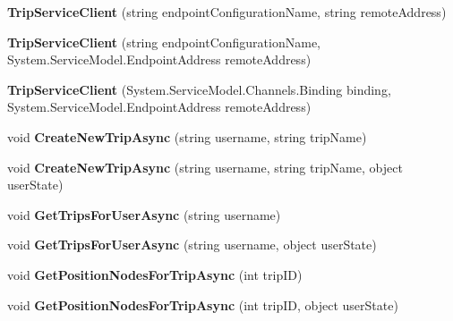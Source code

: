 \begin{DoxyCompactItemize}
\item 
\hypertarget{class_trip_service_client_ab4a2663da378c9b53d77ae14cb527579}{
{\bfseries TripServiceClient} (string endpointConfigurationName, string remoteAddress)}
\label{class_trip_service_client_ab4a2663da378c9b53d77ae14cb527579}

\item 
\hypertarget{class_trip_service_client_a14810eca7652c4f20b773d6f6ee80b4b}{
{\bfseries TripServiceClient} (string endpointConfigurationName, System.ServiceModel.EndpointAddress remoteAddress)}
\label{class_trip_service_client_a14810eca7652c4f20b773d6f6ee80b4b}

\item 
\hypertarget{class_trip_service_client_a74f3aec249adc60fef595b722d37599c}{
{\bfseries TripServiceClient} (System.ServiceModel.Channels.Binding binding, System.ServiceModel.EndpointAddress remoteAddress)}
\label{class_trip_service_client_a74f3aec249adc60fef595b722d37599c}

\item 
\hypertarget{class_trip_service_client_a18cd3772ac45b1a41badea694f81c090}{
void {\bfseries CreateNewTripAsync} (string username, string tripName)}
\label{class_trip_service_client_a18cd3772ac45b1a41badea694f81c090}

\item 
\hypertarget{class_trip_service_client_a9695ce0f452ce4efb9e811b12cd10e57}{
void {\bfseries CreateNewTripAsync} (string username, string tripName, object userState)}
\label{class_trip_service_client_a9695ce0f452ce4efb9e811b12cd10e57}

\item 
\hypertarget{class_trip_service_client_abf37a65ba72504c498cb9dce2f0f91c7}{
void {\bfseries GetTripsForUserAsync} (string username)}
\label{class_trip_service_client_abf37a65ba72504c498cb9dce2f0f91c7}

\item 
\hypertarget{class_trip_service_client_abdaa0d093a9662740585b7e61db6633a}{
void {\bfseries GetTripsForUserAsync} (string username, object userState)}
\label{class_trip_service_client_abdaa0d093a9662740585b7e61db6633a}

\item 
\hypertarget{class_trip_service_client_a951dcd79dea5f318face9724af2fffa9}{
void {\bfseries GetPositionNodesForTripAsync} (int tripID)}
\label{class_trip_service_client_a951dcd79dea5f318face9724af2fffa9}

\item 
\hypertarget{class_trip_service_client_af0903820950892fbd3063b8af0683e1f}{
void {\bfseries GetPositionNodesForTripAsync} (int tripID, object userState)}
\label{class_trip_service_client_af0903820950892fbd3063b8af0683e1f}


\end{DoxyCompactItemize}
